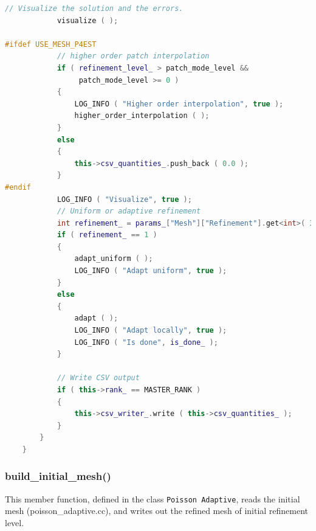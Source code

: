 \documentclass[a4paper, 11pt, twoside]{article}
\begin{document}
\begin{lstlisting}[language=C++, basicstyle={\footnotesize, \ttfamily}, keywordstyle=\color{blue}, numbers=none, tabsize=4]
            // Visualize the solution and the errors.
            visualize ( );

#ifdef USE_MESH_P4EST
            // higher order patch interpolation
            if ( refinement_level_ > patch_mode_level && 
                 patch_mode_level >= 0 )
            {
                LOG_INFO ( "Higher order interpolation", true );
                higher_order_interpolation ( );
            }
            else
            {
                this->csv_quantities_.push_back ( 0.0 );
            }
#endif
            LOG_INFO ( "Visualize", true );
            // Uniform or adaptive refinement
            int refinement_ = params_["Mesh"]["Refinement"].get<int>( 3 );
            if ( refinement_ == 1 )
            {
                adapt_uniform ( );
                LOG_INFO ( "Adapt uniform", true );
            }
            else
            {
                adapt ( );
                LOG_INFO ( "Adapt locally", true );
                LOG_INFO ( "Is done", is_done_ );
            }

            // Write CSV output
            if ( this->rank_ == MASTER_RANK )
            {
                this->csv_writer_.write ( this->csv_quantities_ );
            }
        }
    }
\end{lstlisting}

\subsubsection{build\_initial\_mesh()}\label{read-mesh}
This member function, defined in the class \texttt{Poisson Adaptive}, reads the initial mesh (poisson\_adaptive.cc), and writes out the refined mesh of initial refinement level.
\end{document}
